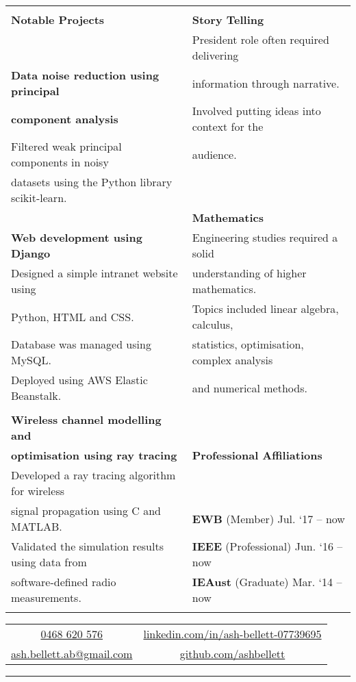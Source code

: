 \documentclass{letter}
\begin{document}
\begin{center}
\begin{tabularx}{\textwidth}{X | X}
	 & \\
	\Large \textbf{Notable Projects} & \textbf{Story Telling}\\
	 & President role often required delivering\\
	\textbf{Data noise reduction using principal} & information through narrative.\\
	\textbf{component analysis} & Involved putting ideas into context for the\\
	Filtered weak principal components in noisy & audience.\\
	datasets using the Python library scikit-learn. & \\
	 & \textbf{Mathematics}\\
	\textbf{Web development using Django} & Engineering studies required a solid\\
	Designed a simple intranet website using & understanding of higher mathematics.\\
	Python, HTML and CSS. & Topics included linear algebra, calculus,\\
	Database was managed using MySQL. & statistics, optimisation, complex analysis\\
	Deployed using AWS Elastic Beanstalk. & and numerical methods.\\
	 & \\
	\cline{2-2}
	\textbf{Wireless channel modelling and} & \\
	\textbf{optimisation using ray tracing} & \Large \textbf{Professional Affiliations}\\
	Developed a ray tracing algorithm for wireless & \\
	signal propagation using C and MATLAB. & \textbf{EWB} (Member) \hfill Jul. `17 -- now\\
	Validated the simulation results using data from & \textbf{IEEE} (Professional) \hfill Jun. `16 -- now\\
	software-defined radio measurements. & \textbf{IEAust} (Graduate) \hfill Mar. `14 -- now\\
	 & \\
	\cline{1-1}
	\cline{2-2}
	\end{tabularx}
	\end{center}
	\begin{center}
	\begin{tabular}{cc}
	\href{tel:61468620576}{0468 620 576} & \href{https://www.linkedin.com/in/ash-bellett-07739695}{linkedin.com/in/ash-bellett-07739695}\\
	\href{mailto:ash.bellett.ab@gmail.com}{ash.bellett.ab@gmail.com} & \href{https://www.github.com/ashbellett}{github.com/ashbellett}
	\end{tabular}
	\end{center}
	\rule[4pt]{\textwidth}{4pt}
	
\end{document}
